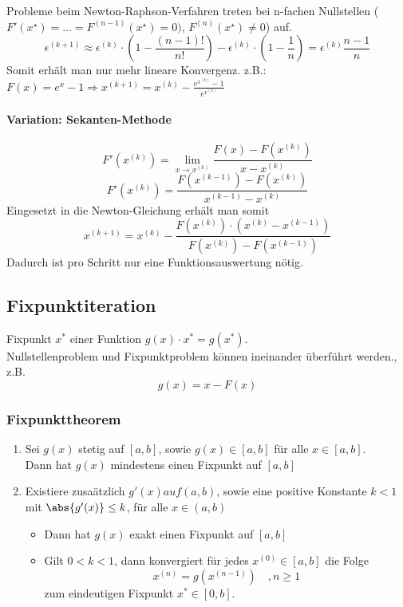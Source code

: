 Probleme beim Newton-Raphson-Verfahren treten bei n-fachen Nullstellen ($F'(x^\star) = \dots = F^{(n - 1)}(x^\star) = 0)$, $F^{(n)}(x^\star) \ne 0$) auf.
\[\epsilon^{(k + 1)} \approx \epsilon^{(k)} \cdot \left( 1 - \frac{(n - 1)!}{n!}\right) - \epsilon^{(k)} \cdot \left( 1 - \frac{1}{n}\right) = \epsilon^{(k)} \frac{n - 1}{n}\]
Somit erhält man nur mehr lineare Konvergenz.
z.B.: $F(x) = e^x - 1 \Rightarrow x^{(k + 1)} = x^{(k)} - \frac{e^{x^{(k)}} - 1}{e^{x^{(k)}}}$

\paragraph{Variation: Sekanten-Methode}
\[F'(x^{(k)}) = \lim_{x \rightarrow x^{(k)}} \frac{F(x) - F(x^{(k)})}{x - x^{(k)}}\]
\[F'(x^{(k)}) = \frac{F(x^{(k - 1)}) - F(x^{(k)})}{x^{(k - 1)} - x^{(k)}}\]
Eingesetzt in die Newton-Gleichung erhält man somit
\[x^{(k + 1)} = x^{(k)} - \frac{F(x^{(k)}) \cdot (x^{(k)} - x^{(k - 1)})}{F(x^{(k)}) - F(x^{(k - 1)})}\]
Dadurch ist pro Schritt nur eine Funktionsauswertung nötig.


\subsection{Fixpunktiteration}
Fixpunkt $x^*$ einer Funktion $g(x)\cdot x^* = g(x^*)$.\\
Nullstellenproblem und Fixpunktproblem können ineinander überführt werden., z.B.
\[g(x) = x - F(x)\]

\subsubsection{Fixpunkttheorem}
\begin{enumerate}
\item Sei $g(x)$ stetig auf $[a,b]$, sowie $g(x)\in [a,b]$ für alle $x\in [a,b]$.\\
Dann hat $g(x)$ mindestens einen Fixpunkt auf $[a,b]$
\item Existiere zusaätzlich $g'(x) auf (a,b)$, sowie eine positive Konstante $k<1$ mit $\abs{g'(x)}\leq k$, für alle $x\in (a,b)$
\begin{itemize}
\item Dann hat $g(x)$ exakt einen Fixpunkt auf $[a,b]$
\item Gilt $0<k<1$, dann konvergiert für jedes $x^{(0)}\in [a,b]$ die Folge 
\[x^{(n)} = g(x^{(n-1)})\quad,n\geq 1\]
zum eindeutigen Fixpunkt $x^*\in [0,b]$.
\end{itemize}
\end{enumerate}

